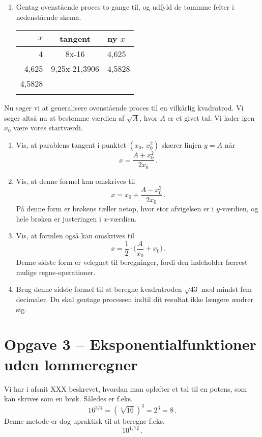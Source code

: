 \documentclass[12pt,oneside,a4paper]{article}
\theoremstyle{plain}
\begin{document}
\begin{enumerate}[label=(\alph*), resume]
    \item Gentag ovenstående proces to gange til, og udfyld de tommme felter i
        nedenstående skema.
        \begin{center}
            \begin{tabular}{|r|c|l|}
\hline
                $x$ & tangent & ny $x$ \\
                \hline
                4 & 8x-16 & 4,625 \\
                \hline
                4,625 & 9,25x-21,3906 & 4,5828 \\
                \hline
                4,5828 & & \\
                \hline
                 & & \\
                \hline
            \end{tabular}
        \end{center}
\end{enumerate}

Nu søger vi at generalisere ovenstående proces til en vilkårlig 
kvadratrod. Vi søger altså nu at bestemme værdien af $\sqrt{A}$, hvor
$A$ er et givet tal. Vi lader igen $x_0$ være vores startværdi.

\begin{enumerate}[label=(\alph*), resume]
    \item Vis, at parablens tangent i punktet $(x_0,\,x_0^2)$ 
        skærer linjen $y=A$ når
        \[
            x = \frac{A+x_0^2}{2x_0}\,.
        \]
    \item Vis, at denne formel kan omskrives til 
        \[
            x = x_0 + \frac{A-x_0^2}{2x_0}\,.
        \]
    På denne form er brøkens tæller netop, hvor stor afvigelsen er i $y$-værdien,
        og hele brøken er justeringen i $x$-værdien.
    \item Vis, at formlen også kan omskrives til
        \[
            x = \frac12 \cdot \Big(\frac{A}{x_0} + x_0\Big) \,.
        \]
    Denne sidste form er velegnet til beregninger, fordi den indeholder færrest
        mulige regne-operationer.

    \item Brug denne sidste formel til at beregne kvadratroden $\sqrt{43}$ med
        mindst fem decimaler. Du skal gentage processen indtil dit resultat
        ikke længere ændrer sig.
\end{enumerate}


\section*{Opgave 3 -- Eksponentialfunktioner uden lommeregner}
Vi har i afsnit XXX beskrevet, hvordan man opløfter et tal til en potens, som
kan skrives som en brøk. Således er f.eks.
\[
    16^{3/4} = (\sqrt[4]{16})^3 = 2^3 = 8 \,.
\]
Denne metode er dog upraktisk til at beregne f.eks.
\[
    10^{1,72} \,.
\]
\end{document}
